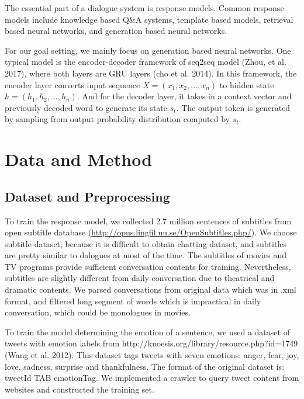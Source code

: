 \documentclass{article}
\begin{document}
The essential part of a dialogue system is response models. Common response models include knowledge based Q\&A systems, template based models, retrieval based neural networks, and generation based neural networks. \par



For our goal setting, we mainly focus on generation based neural networks. One typical model is the encoder-decoder framework of seq2seq model (Zhou, et al. 2017), where both layers are GRU layers (cho et al. 2014). In this framework, the encoder layer converts input sequence $X = (x_1, x_2, ..., x_n)$ to hidden state $h = (h_1, h_2, ..., h_n)$. And for the decoder layer, it takes in a context vector and previously decoded word to generate its state $s_t$. The output token is generated by sampling from output probability distribution computed by $s_t$.




\section{Data and Method}

\subsection{Dataset and Preprocessing}

To train the response model, we collected 2.7 million sentences of subtitles from open subtitle database (\url{http://opus.lingfil.uu.se/OpenSubtitles.php/}). We choose subtitle dataset, because it is difficult to obtain chatting dataset, and subtitles are pretty similar to dalogues at most of the time. The subtitles of movies and TV programs provide sufficient conversation contents for training. Nevertheless, subtitles are slightly different from daily conversation due to theatrical and dramatic contents. We parsed conversations from original data which was in .xml format, and filtered long segment of words which is impractical in daily conversation, which could be monologues in movies. \par

To train the model determining the emotion of a sentence, we used a dataset of tweets with emotion labels from http://knoesis.org/library/resource.php?id=1749 (Wang et al. 2012). This dataset tags tweets with seven emotions: anger, fear, joy, love, sadness, surprise and thankfulness. The format of the original dataset is: tweetId TAB emotionTag. We implemented a crawler to query tweet content from websites and constructed the training set. \par 
\end{document}

